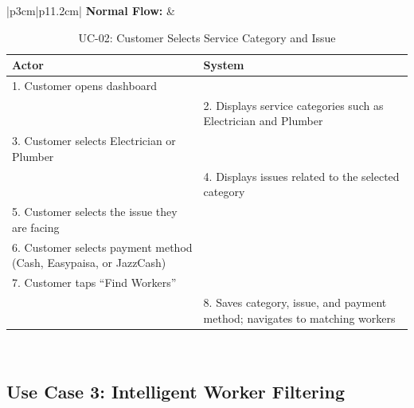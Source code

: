 {\small
\renewcommand{\arraystretch}{1.05}
\begin{table}[H]
\centering
\begin{tabular}{|p{3cm}|p{11.2cm}|}
\hline
\textbf{Normal Flow:} &
\begin{tabular}[t]{|p{5.4cm}|p{5.4cm}|}
\hline
\textbf{Actor} & \textbf{System} \\ \hline
1. Customer opens dashboard & \\ \hline
 & 2. Displays service categories such as Electrician and Plumber \\ \hline
3. Customer selects Electrician or Plumber & \\ \hline
 & 4. Displays issues related to the selected category \\ \hline
5. Customer selects the issue they are facing & \\ \hline
6. Customer selects payment method (Cash, Easypaisa, or JazzCash) & \\ \hline
7. Customer taps ``Find Workers'' & \\ \hline
 & 8. Saves category, issue, and payment method; navigates to matching workers \\ \hline
\end{tabular} \\ \hline
\end{tabular}
\caption{UC-02: Customer Selects Service Category and Issue}
\end{table}
}

\newpage

\subsection*{Use Case 3: Intelligent Worker Filtering}

